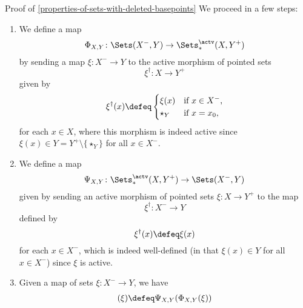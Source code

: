 \begin{Proof}{Proof of \cref{properties-of-sets-with-deleted-basepoints}}
    We proceed in a few steps:
    \begin{enumerate}
        \item\label{proof-of-properties-of-sets-with-deleted-basepoints-adjoint-equivalence-1}We define a map
            \[
                \Phi_{X,Y}%
                \colon%
                \Sets(X^{-},Y)%
                \to%
                \Sets^{\actv}_{*}(X,Y^{+})%
            \]%
            by sending a map $\xi\colon X^{-}\to Y$ to the active morphism of pointed sets%
            \[
                \xi^{\dagger}%
                \colon%
                X%
                \to%
                Y^{+}%
            \]%
            given by
            \[
                \xi^{\dagger}(x)%
                \defeq
                \begin{cases}
                    \xi(x)    &\text{if $x\in X^{-}$,}\\
                    \star_{Y} &\text{if $x=x_{0}$,}
                \end{cases}
            \]%
            for each $x\in X$, where this morphism is indeed active since $\xi(x)\in Y=Y^{+}\setminus\{\star_{Y}\}$ for all $x\in X^{-}$.
        \item\label{proof-of-properties-of-sets-with-deleted-basepoints-adjoint-equivalence-2}We define a map
            \[
                \Psi_{X,Y}%
                \colon%
                \Sets^{\actv}_{*}(X,Y^{+})%
                \to%
                \Sets(X^{-},Y)%
            \]%
            given by sending an active morphism of pointed sets $\xi\colon X\to Y^{+}$ to the map
            \[
                \xi^{\dagger}%
                \colon%
                X^{-}%
                \to%
                Y%
            \]%
            defined by
            \[
                \xi^{\dagger}(x)%
                \defeq%
                \xi(x)
            \]%
            for each $x\in X^{-}$, which is indeed well-defined (in that $\xi(x)\in Y$ for all $x\in X^{-}$) since $\xi$ is active.
        \item\label{proof-of-properties-of-sets-with-deleted-basepoints-adjoint-equivalence-3}Given a map of sets $\xi\colon X^{-}\to Y$, we have
            \begin{align*}
                [\Psi_{X,Y}\circ\Phi_{X,Y}](\xi) &\defeq \Psi_{X,Y}(\Phi_{X,Y}(\xi))\\%

\end{align*}
\end{enumerate}
\end{Proof}
